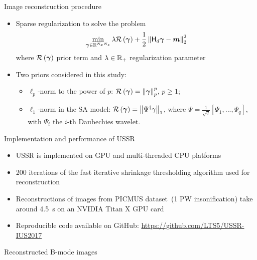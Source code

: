 {\begin{block}{Image reconstruction procedure}
\begin{itemize}
		\item Sparse regularization to solve the problem
		\begin{align}
			\label{eq_regularization_problem}
			\min \limits_{\bm{\gamma} \in \mathbb{R}^{N_xN_z}} \lambda \mathcal{R} \left(\bm{\gamma}\right) + \frac{1}{2} \left\lVert\mathsf{H}_d \bm{\gamma} - \bm{m}\right\rVert_{2}^2
		\end{align}
		where $\mathcal{R} \left(\bm{\gamma}\right)$ prior term and $\lambda \in \mathbb{R}_+$ regularization parameter
		\item Two priors considered in this study:
		\begin{itemize}
			\item $\ell_p$-norm to the power of $p$: $\mathcal{R}\left(\bm{\gamma}\right) = \left\lVert\bm{\gamma}\right\rVert_{p}^p$, $p \geq 1$;
			\item $\ell_1$-norm in the SA model: $\mathcal{R}\left(\bm{\gamma}\right) = \left\lVert\Psi^\dagger\gamma\right\rVert_{1}$, where $\Psi = \frac{1}{\sqrt{q}}\left[\Psi_1,...,\Psi_q\right]$, with $\Psi_i$ the $i$-th Daubechies wavelet.
		\end{itemize}
	\end{itemize}
\end{block}
\vfill
\begin{block}{Implementation and performance of USSR}
	\begin{itemize}
		\item USSR is implemented on GPU and multi-threaded CPU platforms
		\item \num{200} iterations of the fast iterative shrinkage thresholding algorithm used for reconstruction 
		\item Reconstructions of images from PICMUS dataset~(1 PW insonification) take around \SI{4.5}{\second} on an NVIDIA Titan X GPU card
		\item Reproducible code available on GitHub: \url{https://github.com/LTS5/USSR-IUS2017}
	\end{itemize}
\end{block}
\vfill
\begin{block}{Reconstructed B-mode images}

\end{block}}
